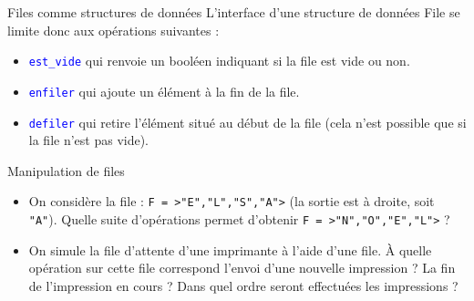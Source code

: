 \documentclass[10pt]{beamer}
\begin{document}
\begin{frame}{\Ctitle}{\stitle}
	\begin{alertblock}{Files comme structures de données}
		L'interface d'une structure de données File se limite donc aux opérations suivantes :
		\begin{itemize}
			\item<2-> \textcolor{blue}{\tt est\_vide} qui renvoie un booléen indiquant si la file est vide ou non.
			\item<3-> \textcolor{blue}{\tt enfiler} qui ajoute un élément à la fin de la file.
			\item<4-> \textcolor{blue}{\tt defiler} qui retire l'élément situé au début de la file (cela n'est possible que si la file n'est pas vide).
		\end{itemize}
	\end{alertblock}
\end{frame}

\begin{frame}{\Ctitle}{\stitle}
	\begin{exampleblock}{Manipulation de files}
		\begin{itemize}
			\item<2-> On considère la file : {\tt F = >"E","L","S","A">} (la sortie est à droite, soit {\tt "A"}). Quelle suite d'opérations permet d'obtenir {\tt F = >"N","O","E","L">} ?
			\item<3-> On simule la file d'attente d'une imprimante à l'aide d'une file. À quelle opération sur cette file correspond l'envoi d'une nouvelle impression ? La fin de l'impression en cours ? Dans quel ordre seront effectuées les impressions ?
		\end{itemize}
	\end{exampleblock}
\end{frame}
\end{document}
